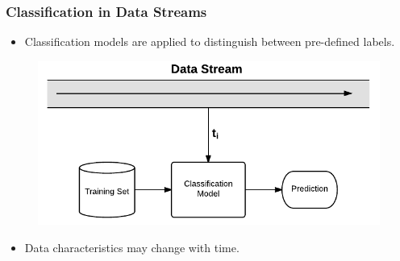 \documentclass[14pt]{beamer}
\begin{document}
\begin{frame}\frametitle{Classification in Data Streams}

\begin{itemize}
\item Classification models are applied to distinguish between pre-defined labels.
\end{itemize}

\vspace{-0.2in}
\begin{figure}
\centering
\includegraphics[scale=0.6]{Stream1}
\end{figure}
\vspace{-0.2in}
\pause
\begin{itemize}
\item \alert{Data characteristics may change with time}.
\end{itemize}
\end{frame}
\end{document}
